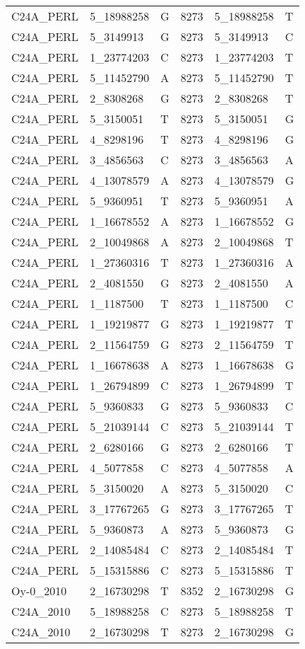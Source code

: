 \begin{center}
\begin{longtable}{|l|l|l|l|l|l|}
C24A\_PERL&5\_18988258&G&8273&5\_18988258&T\\
C24A\_PERL&5\_3149913&G&8273&5\_3149913&C\\
C24A\_PERL&1\_23774203&C&8273&1\_23774203&T\\
C24A\_PERL&5\_11452790&A&8273&5\_11452790&T\\
C24A\_PERL&2\_8308268&G&8273&2\_8308268&T\\
C24A\_PERL&5\_3150051&T&8273&5\_3150051&G\\
C24A\_PERL&4\_8298196&T&8273&4\_8298196&G\\
C24A\_PERL&3\_4856563&C&8273&3\_4856563&A\\
C24A\_PERL&4\_13078579&A&8273&4\_13078579&G\\
C24A\_PERL&5\_9360951&T&8273&5\_9360951&A\\
C24A\_PERL&1\_16678552&A&8273&1\_16678552&G\\
C24A\_PERL&2\_10049868&A&8273&2\_10049868&T\\
C24A\_PERL&1\_27360316&T&8273&1\_27360316&A\\
C24A\_PERL&2\_4081550&G&8273&2\_4081550&A\\
C24A\_PERL&1\_1187500&T&8273&1\_1187500&C\\
C24A\_PERL&1\_19219877&G&8273&1\_19219877&T\\
C24A\_PERL&2\_11564759&G&8273&2\_11564759&T\\
C24A\_PERL&1\_16678638&A&8273&1\_16678638&G\\
C24A\_PERL&1\_26794899&C&8273&1\_26794899&T\\
C24A\_PERL&5\_9360833&G&8273&5\_9360833&C\\
C24A\_PERL&5\_21039144&C&8273&5\_21039144&T\\
C24A\_PERL&2\_6280166&G&8273&2\_6280166&T\\
C24A\_PERL&4\_5077858&C&8273&4\_5077858&A\\
C24A\_PERL&5\_3150020&A&8273&5\_3150020&C\\
C24A\_PERL&3\_17767265&G&8273&3\_17767265&T\\
C24A\_PERL&5\_9360873&A&8273&5\_9360873&G\\
C24A\_PERL&2\_14085484&C&8273&2\_14085484&T\\
C24A\_PERL&5\_15315886&C&8273&5\_15315886&T\\
Oy-0\_2010&2\_16730298&T&8352&2\_16730298&G\\
C24A\_2010&5\_18988258&C&8273&5\_18988258&T\\
C24A\_2010&2\_16730298&T&8273&2\_16730298&G\\

\end{longtable}
\end{center}
